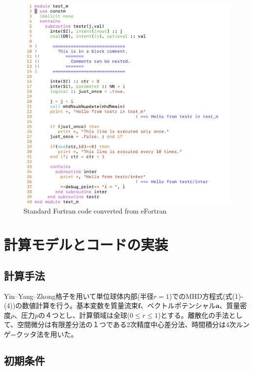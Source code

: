 \documentclass[12pt]{jsarticle}
\begin{document}
\begin{figure}[H]
\centering
\includegraphics[height=1.0\textheight,width=1.0\hsize,angle=0,keepaspectratio]{./Image/sample2_f90.png}
\caption{Standard Fortran code converted from eFortran} \label{sample_f90}
\end{figure}


\section{計算モデルとコードの実装}

\subsection{計算手法}
Yin--Yang--Zhong格子を用いて単位球体内部(半径$r=1$)でのMHD方程式(式(1)-(4))の数値計算を行う。基本変数を質量流束$\bm f$、ベクトルポテンシャル$\bm{a}$、質量密度$\rho$、圧力$p$の４つとし、計算領域は全球($0 \leq r \leq 1$)とする。離散化の手法として、空間微分は有限差分法の１つである2次精度中心差分法、時間積分は4次ルンゲ=クッタ法を用いた。

\subsection{初期条件}
\end{document}

